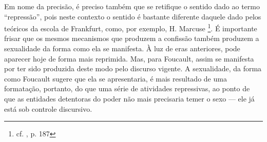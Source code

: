 \documentclass[12pt,a4paper]{article}
\begin{document}
	Em nome da precisão, é preciso também que se retifique o sentido dado 
	ao termo ``repressão'', pois neste contexto o sentido é bastante diferente 
	daquele dado pelos teóricos da escola de Frankfurt, como, por exemplo, 
	H. Marcuse 
		\footnote{cf. \cite{merquior}, p. 187}. 
	É importante frisar que os mesmos mecanismos que produzem a confissão 
	também produzem a sexualidade da forma como ela se manifesta. À luz de 
	eras anteriores, pode aparecer hoje de forma mais reprimida. Mas, para 
	Foucault, assim se manifesta por ter sido produzida deste modo pelo 
	discurso vigente. A sexualidade, da forma como Foucault sugere que ela 
	se apresentaria, é mais resultado de uma formatação, portanto, do que 
	uma série de atividades repressivas, ao ponto de que as entidades 
	detentoras do poder não mais precisaria temer o sexo --- ele já está 
	sob controle discursivo. 
	

	
	

	\newpage
	
	
\end{document}

